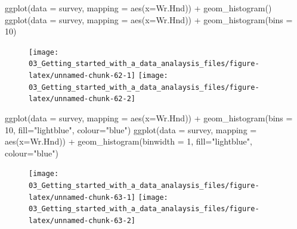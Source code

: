 \documentclass[
]{book}
\newenvironment{Shaded}{\begin{snugshade}}{\end{snugshade}}
\newcommand{\AttributeTok}[1]{\textcolor[rgb]{0.77,0.63,0.00}{#1}}
\newcommand{\DecValTok}[1]{\textcolor[rgb]{0.00,0.00,0.81}{#1}}
\newcommand{\FunctionTok}[1]{\textcolor[rgb]{0.00,0.00,0.00}{#1}}
\newcommand{\NormalTok}[1]{#1}
\newcommand{\SpecialCharTok}[1]{\textcolor[rgb]{0.00,0.00,0.00}{#1}}
\newcommand{\StringTok}[1]{\textcolor[rgb]{0.31,0.60,0.02}{#1}}
\begin{document}
\begin{Shaded}
\begin{Highlighting}[]
\FunctionTok{ggplot}\NormalTok{(}\AttributeTok{data =}\NormalTok{ survey, }\AttributeTok{mapping =} \FunctionTok{aes}\NormalTok{(}\AttributeTok{x=}\NormalTok{Wr.Hnd)) }\SpecialCharTok{+} \FunctionTok{geom\_histogram}\NormalTok{()}
\FunctionTok{ggplot}\NormalTok{(}\AttributeTok{data =}\NormalTok{ survey, }\AttributeTok{mapping =} \FunctionTok{aes}\NormalTok{(}\AttributeTok{x=}\NormalTok{Wr.Hnd)) }\SpecialCharTok{+} \FunctionTok{geom\_histogram}\NormalTok{(}\AttributeTok{bins =} \DecValTok{10}\NormalTok{)}
\end{Highlighting}
\end{Shaded}

\begin{figure}
\texttt{[image: 03\_Getting\_started\_with\_a\_data\_analaysis\_files/figure-latex/unnamed-chunk-62-1]} \texttt{[image: 03\_Getting\_started\_with\_a\_data\_analaysis\_files/figure-latex/unnamed-chunk-62-2]} \end{figure}

\begin{Shaded}
\begin{Highlighting}[]
\FunctionTok{ggplot}\NormalTok{(}\AttributeTok{data =}\NormalTok{ survey, }\AttributeTok{mapping =} \FunctionTok{aes}\NormalTok{(}\AttributeTok{x=}\NormalTok{Wr.Hnd)) }\SpecialCharTok{+} 
  \FunctionTok{geom\_histogram}\NormalTok{(}\AttributeTok{bins =} \DecValTok{10}\NormalTok{, }\AttributeTok{fill=}\StringTok{"lightblue"}\NormalTok{, }\AttributeTok{colour=}\StringTok{"blue"}\NormalTok{)}
\FunctionTok{ggplot}\NormalTok{(}\AttributeTok{data =}\NormalTok{ survey, }\AttributeTok{mapping =} \FunctionTok{aes}\NormalTok{(}\AttributeTok{x=}\NormalTok{Wr.Hnd)) }\SpecialCharTok{+} 
  \FunctionTok{geom\_histogram}\NormalTok{(}\AttributeTok{binwidth =} \DecValTok{1}\NormalTok{, }\AttributeTok{fill=}\StringTok{"lightblue"}\NormalTok{, }\AttributeTok{colour=}\StringTok{"blue"}\NormalTok{)}
\end{Highlighting}
\end{Shaded}

\begin{figure}
\texttt{[image: 03\_Getting\_started\_with\_a\_data\_analaysis\_files/figure-latex/unnamed-chunk-63-1]} \texttt{[image: 03\_Getting\_started\_with\_a\_data\_analaysis\_files/figure-latex/unnamed-chunk-63-2]} \end{figure}
\end{document}
